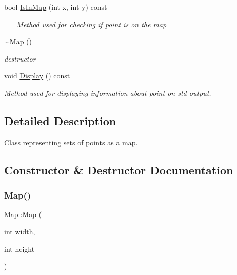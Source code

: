 \begin{DoxyCompactItemize}
bool \mbox{\hyperlink{class_map_a7b9c227621696cda01445fdae6a3c80d}{Is\+In\+Map}} (int x, int y) const
\begin{DoxyCompactList}\small\item\em ~\newline
~\newline
Method used for checking if point is on the map \end{DoxyCompactList}\item 
\mbox{\label{class_map_aa403fbe09394ccf39747588f5168e3b2}} 
\mbox{\hyperlink{class_map_aa403fbe09394ccf39747588f5168e3b2}{$\sim$\+Map}} ()
\begin{DoxyCompactList}\small\item\em destructor \end{DoxyCompactList}\item 
\mbox{\label{class_map_a88353e04db090336b830c1353cff7f71}} 
void \mbox{\hyperlink{class_map_a88353e04db090336b830c1353cff7f71}{Display}} () const
\begin{DoxyCompactList}\small\item\em Method used for displaying information about point on std output. \end{DoxyCompactList}\end{DoxyCompactItemize}


\subsection{Detailed Description}
Class representing sets of points as a map. 

\subsection{Constructor \& Destructor Documentation}
\mbox{\label{class_map_a8497952fd6e1f0584d868e6ceb97d42d}} 
\subsubsection{\texorpdfstring{Map()}{Map()}\hspace{0.1cm}{\footnotesize\ttfamily [1/2]}}
{\footnotesize\ttfamily Map\+::\+Map (\begin{DoxyParamCaption}\item[{int}]{width,  }\item[{int}]{height }\end{DoxyParamCaption})\hspace{0.3cm}{\ttfamily [explicit]}}



